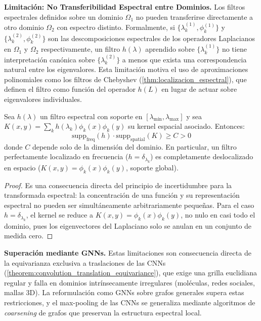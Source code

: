 \textbf{Limitación: No Transferibilidad Espectral entre Dominios.}\label{lim:transferibilidad} Los filtros espectrales definidos sobre un dominio $\Omega_1$ no pueden transferirse directamente a otro dominio $\Omega_2$ con espectro distinto. Formalmente, si $\{\lambda_k^{(1)}, \phi_k^{(1)}\}$ y $\{\lambda_k^{(2)}, \phi_k^{(2)}\}$ son las descomposiciones espectrales de los operadores Laplacianos en $\Omega_1$ y $\Omega_2$ respectivamente, un filtro $h(\lambda)$ aprendido sobre $\{\lambda_k^{(1)}\}$ no tiene interpretación canónica sobre $\{\lambda_k^{(2)}\}$ a menos que exista una correspondencia natural entre los eigenvalores. Esta limitación motiva el uso de aproximaciones polinomiales como los filtros de Chebyshev (\autoref{thm:localizacion_espectral}), que definen el filtro como función del operador $h(L)$ en lugar de actuar sobre eigenvalores individuales.

\begin{proposition}\label{prop:tradeoff_localizacion}
Sea $h(\lambda)$ un filtro espectral con soporte en $[\lambda_{\min}, \lambda_{\max}]$ y sea $K(x,y) = \sum_k h(\lambda_k) \phi_k(x)\phi_k(y)$ su kernel espacial asociado. Entonces:
\begin{equation}
\text{supp}_{\text{freq}}(h) \cdot \text{supp}_{\text{spatial}}(K) \geq C > 0
\end{equation}
donde $C$ depende solo de la dimensión del dominio. En particular, un filtro perfectamente localizado en frecuencia ($h = \delta_{\lambda_k}$) es completamente deslocalizado en espacio ($K(x,y) = \phi_k(x)\phi_k(y)$, soporte global).
\end{proposition}

\begin{proof}
Es una consecuencia directa del principio de incertidumbre para la transformada espectral: la concentración de una función y su representación espectral no pueden ser simultáneamente arbitrariamente pequeñas. Para el caso $h = \delta_{\lambda_k}$, el kernel se reduce a $K(x,y) = \phi_k(x)\phi_k(y)$, no nulo en casi todo el dominio, pues los eigenvectores del Laplaciano solo se anulan en un conjunto de medida cero.
\end{proof}

\textbf{Superación mediante GNNs.} Estas limitaciones son consecuencia directa de la equivarianza exclusiva a traslaciones de las CNNs (\autoref{theorem:convolution_translation_equivariance}), que exige una grilla euclidiana regular y falla en dominios intrínsecamente irregulares (moléculas, redes sociales, mallas 3D). La reformulación como GNNs sobre grafos generales supera estas restricciones, y el max-pooling de las CNNs se generaliza mediante algoritmos de \textit{coarsening} de grafos que preservan la estructura espectral local.

